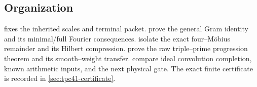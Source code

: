\subsection{Organization}

 fixes the inherited scales and terminal packet.
 prove the general Gram
identity and its minimal/full Fourier consequences.
 isolate the exact
four--M\"obius remainder and its Hilbert compression.
 prove the raw
triple--prime progression theorem and its smooth--weight transfer.
compare ideal convolution completion, known arithmetic inputs, and the
next physical gate.  The exact finite certificate is recorded in
\cref{sec:tpc41-certificate}.
